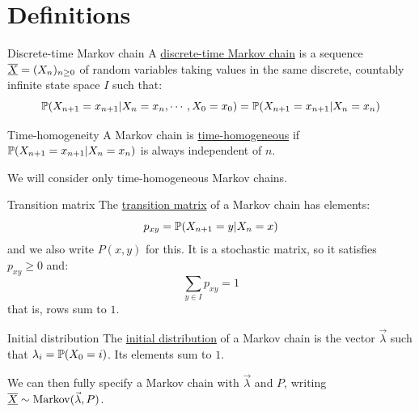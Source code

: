 \documentclass[../Main.tex]{subfiles}
\begin{document}
\section{Definitions}
\begin{definition}{Discrete-time Markov chain}
    A \underline{discrete-time Markov chain} is a sequence $\chain{X} = (X_n)_{n \geq 0}$ of random variables taking values in the same discrete, countably infinite state space $I$ such that:
    \begin{equation*}
        \P(X_{n+1} = x_{n + 1} | X_n = x_n, \cdots, X_0 = x_0) = \P(X_{n+1} = x_{n + 1} | X_n = x_n)
    \end{equation*}
\end{definition}
\begin{definition}{Time-homogeneity}
    A Markov chain is \underline{time-homogeneous} if $\P(X_{n+1} = x_{n+1} | X_n = x_n)$ is always independent of $n$.
\end{definition}
We will consider only time-homogeneous Markov chains.

\begin{definition}{Transition matrix}
    The \underline{transition matrix} of a Markov chain has elements:
    \begin{equation*}
        p_{xy} = \P(X_{n+1} = y | X_n = x)
    \end{equation*}
    and we also write $P(x, y)$ for this. It is a stochastic matrix, so it satisfies $p_{xy} \geq 0$ and:
    \begin{equation*}
        \sum_{y \in I} p_{xy} = 1
    \end{equation*}
    that is, rows sum to $1$.
\end{definition}
\begin{definition}{Initial distribution}
    The \underline{initial distribution} of a Markov chain is the vector $\vec{\lambda}$ such that $\lambda_i = \P(X_0 = i)$. Its elements sum to $1$.
\end{definition}
We can then fully specify a Markov chain with $\vec{\lambda}$ and $P$, writing $\chain{X} \sim \Mkv{\vec{\lambda}}{P}$.
\end{document}
